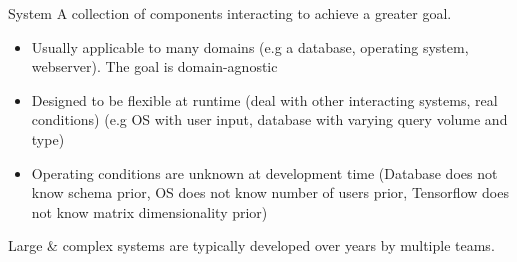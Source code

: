 \begin{definitionbox}{System}
    A collection of components interacting to achieve a greater goal.
    \begin{itemize}
        \item Usually applicable to many domains (e.g a database, operating system, webserver). The goal is domain-agnostic
        \item Designed to be flexible at runtime (deal with other interacting systems, real conditions) (e.g OS with user input, database with varying query volume and type)
        \item Operating conditions are unknown at development time (Database does not know schema prior, OS does not know number of users prior, Tensorflow does not know matrix dimensionality prior)
    \end{itemize}
    Large \& complex systems are typically developed over years by multiple teams.
\end{definitionbox}

